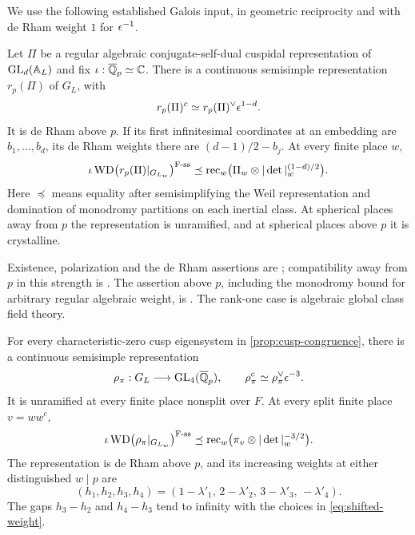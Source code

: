 We use the following established Galois input, in geometric
reciprocity and with de Rham weight $1$ for $\epsilon^{-1}$.
\begin{theorem}
\label{thm:racsd-galois-input}
Let $\Pi$ be a regular algebraic conjugate-self-dual cuspidal
representation of $\operatorname{GL}_d(\mathbb A_L)$ and fix
$\iota:\overline{\mathbb Q}_p\simeq\mathbb C$.  There is a continuous
semisimple representation $r_p(\Pi)$ of $G_L$, with
\[
 r_p(\Pi)^c\simeq r_p(\Pi)^\vee\epsilon^{1-d}.
\]
It is de Rham above $p$.  If its first infinitesimal coordinates
at an embedding are $b_1,\ldots,b_d$, its de Rham weights there
are $(d-1)/2-b_j$.  At every finite place $w$,
\begin{equation}
 \iota\operatorname{WD}\bigl(r_p(\Pi)|_{G_{L_w}}\bigr)^{\mathrm{F\text{-}ss}}
 \preceq
 \operatorname{rec}_w
     \bigl(\Pi_w\otimes|\det|_w^{(1-d)/2}\bigr).
 \label{eq:racsd-compatibility}
\end{equation}
Here $\preceq$ means equality after semisimplifying the Weil
representation and domination of monodromy partitions on each
inertial class.  At spherical places away from $p$ the
representation is unramified, and at spherical places above $p$
it is crystalline.
\end{theorem}

Existence, polarization and the de Rham assertions are
\citet[Theorem 1.2]{BGHT2011}; compatibility away from $p$
in this strength is
\citet[Theorem 3.2.3]{ChenevierHarris2013}.
The assertion above $p$, including the monodromy bound for
arbitrary regular algebraic weight, is
\citet[Theorem 1.1]{BLGGT2014}.
The rank-one case is algebraic global class field theory.

\begin{proposition}
\label{prop:galois-package}
For every characteristic-zero cusp eigensystem in
\cref{prop:cusp-congruence}, there is a continuous semisimple
representation
\[
 \rho_\pi:G_L\longrightarrow\operatorname{GL}_4(\overline{\mathbb Q}_p),
 \qquad
 \rho_\pi^c\simeq\rho_\pi^\vee\epsilon^{-3}.
\]
It is unramified at every finite place nonsplit over $F$.
At every split finite place $v=ww^c$,
\begin{equation}
 \iota\operatorname{WD}\bigl(\rho_\pi|_{G_{L_w}}\bigr)^{\mathrm{F\text{-}ss}}
 \preceq
 \operatorname{rec}_w
        \bigl(\pi_v\otimes|\det|_w^{-3/2}\bigr).
 \label{eq:four-dimensional-compatibility}
\end{equation}
The representation is de Rham above $p$, and its increasing
weights at either distinguished $w\mid p$ are
\begin{equation}
 (h_1,h_2,h_3,h_4)
  =(1-\lambda'_1,\,2-\lambda'_2,\,
    3-\lambda'_3,\,-\lambda'_4).
 \label{eq:hodge-weights}
\end{equation}
The gaps $h_3-h_2$ and $h_4-h_3$ tend to infinity with the
choices in \cref{eq:shifted-weight}.
\end{proposition}

